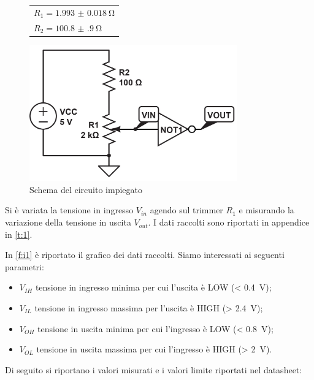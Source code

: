 \documentclass[a4paper,11pt]{article}
\begin{document}
\begin{figure}[H]
	\begin{minipage}{0.4\textwidth}
		\centering
		\begin{tabular}{l}
			$R_1 = \SI{1.993(18)}{\ohm}$\\
			$R_2 = \SI{100.8(9)}{\ohm}$
		\end{tabular}
	\end{minipage}
	\begin{minipage}{0.6\textwidth}
		\centering
		\includegraphics[width=0.8\textwidth]{immagine1.jpg}
		\caption{Schema del circuito impiegato}
		\label{f:c1}
	\end{minipage}
\end{figure}

Si è variata la tensione in ingresso $V_{in}$ agendo sul trimmer $R_1$ e misurando la variazione della tensione in uscita $V_{out}$. I dati raccolti sono riportati in appendice in \tablename{ \ref{t:1}}.

In \figurename{ \ref{f:i1}} è riportato il grafico dei dati raccolti.
Siamo interessati ai seguenti parametri:
\begin{itemize}
\item $V_{IH}$ tensione in ingresso minima per cui  l'uscita è LOW (< \SI{0.4}{\volt});
\item $V_{IL}$ tensione in ingresso massima per  l'uscita è HIGH (> \SI{2.4}{\volt});
\item $V_{OH}$ tensione in uscita minima per cui l'ingresso è LOW (< \SI{0.8}{\volt});
\item $V_{OL}$ tensione in uscita massima per cui  l'ingresso è HIGH (> \SI{2}{\volt}).
\end{itemize}

Di seguito si riportano i valori misurati e i valori limite riportati nel datasheet:
\end{document}
